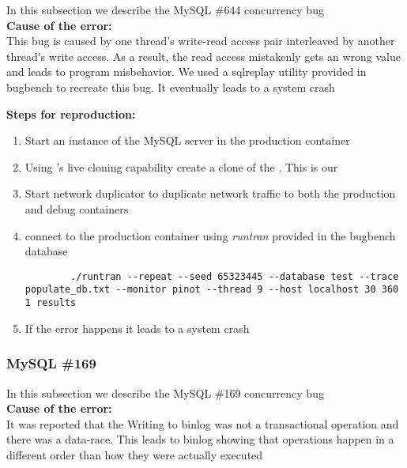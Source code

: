 In this subsection we describe the MySQL \#644 concurrency bug \\

\noindent \textbf{Cause of the error:} \\

This bug is caused by one thread's write-read access pair interleaved by another thread's write access. 
As a result, the read access mistakenly gets an wrong value and leads to program misbehavior.
We used a sqlreplay utility provided in bugbench to recreate this bug. It eventually leads to a system crash

\noindent \textbf{Steps for reproduction:} \\

\begin{adjustwidth}{0.5cm}{}
	\begin{enumerate}
		\item Start an instance of the MySQL server in the production container
		\item Using \parikshan's live cloning capability create a clone of the \productioncontainer. This is our \debugcontainer
		\item Start network duplicator to duplicate network traffic to both the production and debug containers
		\item connect to the production container using \emph{runtran} provided in the bugbench database
		
		\begin{lstlisting}
		./runtran --repeat --seed 65323445 --database test --trace populate_db.txt --monitor pinot --thread 9 --host localhost 30 360 1 results
		\end{lstlisting}
		
		\item If the error happens it leads to a system crash
		
	\end{enumerate}
\end{adjustwidth}	


\subsubsection{MySQL \#169}

In this subsection we describe the MySQL \#169 concurrency bug \\

\noindent \textbf{Cause of the error:} \\
It was reported that the Writing to binlog was not a transactional operation and there was a data-race. 
This leads to binlog showing that operations happen in a different order than how they were actually executed

